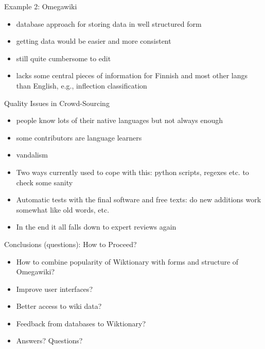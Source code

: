 \documentclass{beamer}
\begin{document}
\begin{frame}{Example 2: Omegawiki}
    \begin{itemize}
        \item database approach for storing data in well structured form
        \item getting data would be easier and more consistent
        \item still quite cumbersome to edit
        \item lacks some central pieces of information for Finnish and most
            other langs than English, e.g., inflection classification
    \end{itemize}
\end{frame}


\begin{frame}{Quality Issues in Crowd-Sourcing}
    \begin{itemize}
        \item people know lots of their native languages but not always enough
        \item some contributors are language learners
        \item vandalism
        \item Two ways currently used to cope with this: python scripts, regexes
            etc. to check some sanity
        \item Automatic tests with the final software and free texts: do new
            additions work somewhat like old words, etc.
        \item In the end it all falls down to expert reviews again
    \end{itemize}
\end{frame}

\begin{frame}{Conclusions (questions): How to Proceed?}
    \begin{itemize}
        \item How to combine popularity of Wiktionary with forms and structure
            of Omegawiki?
        \item Improve user interfaces?
        \item Better access to wiki data?
        \item Feedback from databases to Wiktionary?
        \item Answers? Questions? 
    \end{itemize}
\end{frame}
\end{document}

